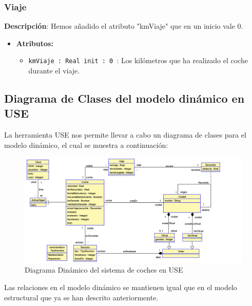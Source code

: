 \documentclass[12pt.a4paper]{article}
\begin{document}
\subsubsection{Viaje}
\textbf{Descripción}:  Hemos añadido el atributo "kmViaje" que en un inicio vale 0.
\begin{itemize}
    \item \textbf{Atributos:}
    \begin{itemize}
        \item \texttt{kmViaje : Real init : 0 }: Los kilómetros que ha realizado el coche durante el viaje.
    \end{itemize}
\end{itemize}

\subsection{Diagrama de Clases del modelo dinámico en USE}
La herramienta USE nos permite llevar a cabo un diagrama de clases para el modelo dinámico, el cual se muestra a continuación:
\begin{figure}[H]
     \includegraphics[width=1\linewidth]{diagramas/USE_B.png}
     \caption{Diagrama Dinámico del sistema de coches en USE}
     \label{Diagrama Dinámico del sistema de coches en USE}
\end{figure}

Las relaciones en el modelo dinámico se mantienen igual que en el modelo estructural que ya se han descrito anteriormente.
\end{document}
